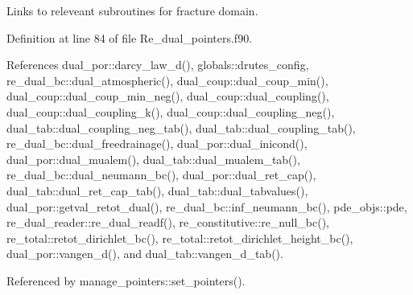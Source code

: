 Links to releveant subroutines for fracture domain. 



Definition at line 84 of file Re\+\_\+dual\+\_\+pointers.\+f90.



References dual\+\_\+por\+::darcy\+\_\+law\+\_\+d(), globals\+::drutes\+\_\+config, re\+\_\+dual\+\_\+bc\+::dual\+\_\+atmospheric(), dual\+\_\+coup\+::dual\+\_\+coup\+\_\+min(), dual\+\_\+coup\+::dual\+\_\+coup\+\_\+min\+\_\+neg(), dual\+\_\+coup\+::dual\+\_\+coupling(), dual\+\_\+coup\+::dual\+\_\+coupling\+\_\+k(), dual\+\_\+coup\+::dual\+\_\+coupling\+\_\+neg(), dual\+\_\+tab\+::dual\+\_\+coupling\+\_\+neg\+\_\+tab(), dual\+\_\+tab\+::dual\+\_\+coupling\+\_\+tab(), re\+\_\+dual\+\_\+bc\+::dual\+\_\+freedrainage(), dual\+\_\+por\+::dual\+\_\+inicond(), dual\+\_\+por\+::dual\+\_\+mualem(), dual\+\_\+tab\+::dual\+\_\+mualem\+\_\+tab(), re\+\_\+dual\+\_\+bc\+::dual\+\_\+neumann\+\_\+bc(), dual\+\_\+por\+::dual\+\_\+ret\+\_\+cap(), dual\+\_\+tab\+::dual\+\_\+ret\+\_\+cap\+\_\+tab(), dual\+\_\+tab\+::dual\+\_\+tabvalues(), dual\+\_\+por\+::getval\+\_\+retot\+\_\+dual(), re\+\_\+dual\+\_\+bc\+::inf\+\_\+neumann\+\_\+bc(), pde\+\_\+objs\+::pde, re\+\_\+dual\+\_\+reader\+::re\+\_\+dual\+\_\+readf(), re\+\_\+constitutive\+::re\+\_\+null\+\_\+bc(), re\+\_\+total\+::retot\+\_\+dirichlet\+\_\+bc(), re\+\_\+total\+::retot\+\_\+dirichlet\+\_\+height\+\_\+bc(), dual\+\_\+por\+::vangen\+\_\+d(), and dual\+\_\+tab\+::vangen\+\_\+d\+\_\+tab().



Referenced by manage\+\_\+pointers\+::set\+\_\+pointers().


